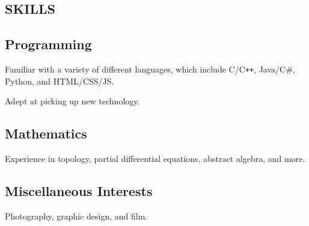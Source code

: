 \documentclass[11pt]{article}
\begin{document}
\begin{multicols}{2}
\section*{SKILLS}

\subsection*{Programming}
Familiar with a variety of different languages, which include C/C{}\verb!++!, Java/C\#, Python, and HTML/CSS/JS.

Adept at picking up new technology.

\subsection*{Mathematics}
Experience in topology, partial differential equations, abstract algebra, and more.

\subsection*{Miscellaneous Interests}
Photography, graphic design, and film.

\end{multicols}
\end{document}
